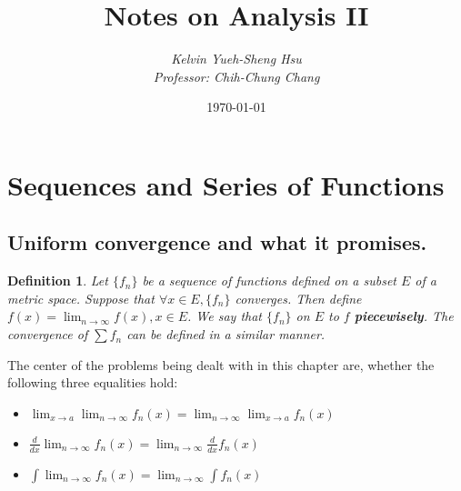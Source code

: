 \documentclass[12pt]{article}
\title{\textbf{Notes on Analysis II}}  %
\author{\emph{Kelvin Yueh-Sheng Hsu}\\\emph{Professor: Chih-Chung Chang}}      %
\date{\today}      %
\newtheorem{defn}{Definition}[section]
\newcommand{\limn}{\lim_{n \rightarrow \infty}}
\begin{document}
\maketitle                   %

\section{Sequences and Series of Functions}
\subsection{Uniform convergence and what it promises.}
\begin{defn}
Let $\{f_n\}$ be a sequence of functions defined on a subset $E$ of a metric space. Suppose that $\forall x \in E, \{f_n\}$ converges. Then define $f(x) = \lim_{n \rightarrow \infty} f(x), x \in E$. We say that $\{f_n\}$ on $E$ to $f$ \textbf{piecewisely}. The convergence of $\sum f_n$ can be defined in a similar manner.
\end{defn}

The center of the problems being dealt with in this chapter are, whether the following three equalities hold:
\begin{itemize}
\item $\displaystyle{\lim_{x \rightarrow a}\limn f_n(x) = \limn\lim_{x \rightarrow a} f_n(x)}$
\item $\displaystyle{\frac{d}{dx} \limn f_n(x) = \limn \frac{d}{dx} f_n(x)}$
\item $\displaystyle{ \int \limn f_n(x) = \limn \int f_n(x) }$
\end{itemize}
\end{document}
